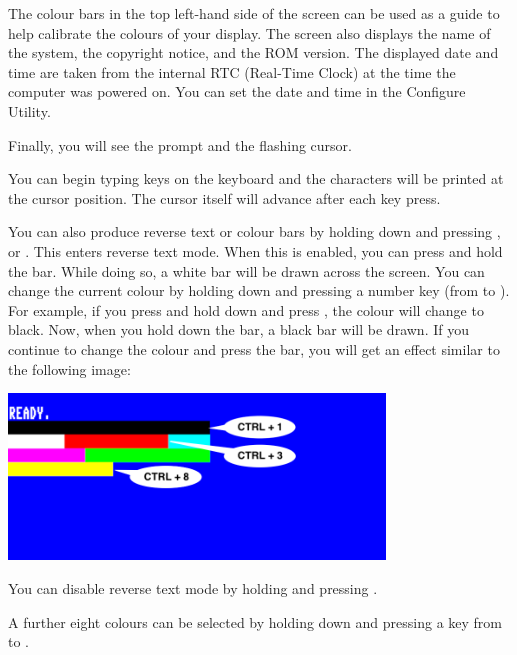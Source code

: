 The colour bars in the top left-hand side of the screen can be used as a guide to help calibrate the colours of your display. The screen also displays the name of the system, the copyright notice, and the ROM version. The displayed date and time are taken from the internal RTC (Real-Time Clock) at the time the computer was powered on. You can set the date and time in the Configure Utility.

Finally, you will see the  prompt and the flashing cursor.

You can begin typing keys on the keyboard and the characters will be printed at the cursor position. The cursor itself will advance after each key press.

You can also produce reverse text or colour bars by holding down  and pressing , or . This enters reverse text mode. When this is enabled, you can press and hold the  bar. While doing so, a white bar will be drawn across the screen.
You can change the current colour by holding  down and pressing a number key (from 
to ). For example, if you press and hold  down and press , the colour will
change to black. Now, when you hold down the  bar, a black bar will be drawn. If you continue to
change the colour and press the  bar, you will get an effect similar to the following image:

\begin{center}
\includegraphics[width={10cm}]{images/introduction-screen/colour-bars.png}
\end{center}

You can disable reverse text mode by holding  and pressing .

A further eight colours can be selected by holding down \megasymbolkey and pressing a key from  to .

